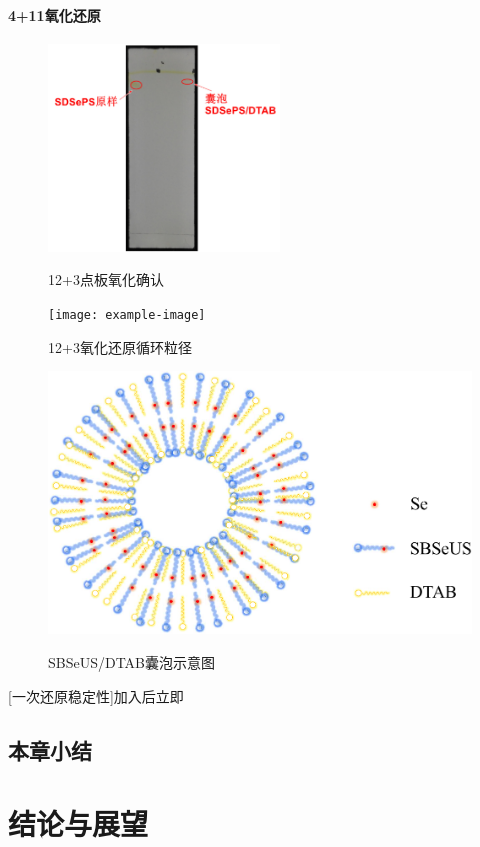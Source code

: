 \documentclass[bachelor,fandolfonts,replaceperiod]{jnuthesis}
\begin{document}
    \subsubsection{4+11氧化还原}
    \begin{figure}[htbp]
        \centering
        \includegraphics[height=5.5cm]{figure/SDSePS-Ox-tlc}\\
        \caption{12+3点板氧化确认}\label{figSDSePS-Ox-tlc:}
    \end{figure}
    
    \begin{figure}[htbp]
        \centering
        \texttt{[image: example-image]}\\
        \caption{12+3氧化还原循环粒径}\label{fig:}
    \end{figure}
    
    \begin{figure}[htbp]
        \centering
        \includegraphics[width=0.46\linewidth]{figure/vesicle-scheme.pdf}\\
        \caption{SBSeUS/DTAB囊泡示意图}\label{fig:vesicle-concentration-line}
    \end{figure}
    [一次还原稳定性]加入后立即
    
    \section{本章小结}

    \chapter{结论与展望}\label{chapter:concludes}
\end{document}
